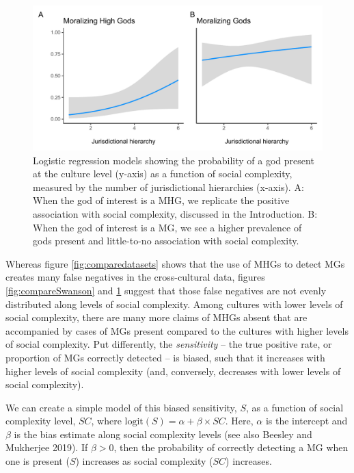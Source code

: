 \documentclass[
]{article}
\begin{document}
\begin{figure}
\centering
\includegraphics{mhg-writeup_files/figure-latex/compareSwansonMods-1.pdf}
\caption{\label{fig:compareSwansonMods}Logistic regression models showing the probability of a god present at the culture level (y-axis) as a function of social complexity, measured by the number of jurisdictional hierarchies (x-axis). A: When the god of interest is a MHG, we replicate the positive association with social complexity, discussed in the Introduction. B: When the god of interest is a MG, we see a higher prevalence of gods present and little-to-no association with social complexity.}
\end{figure}

Whereas figure \ref{fig:comparedatasets} shows that the use of MHGs to detect MGs creates many false negatives in the cross-cultural data, figures \ref{fig:compareSwanson} and \ref{fig:compareSwansonMods} suggest that those false negatives are not evenly distributed along levels of social complexity. Among cultures with lower levels of social complexity, there are many more claims of MHGs absent that are accompanied by cases of MGs present compared to the cultures with higher levels of social complexity. Put differently, the \emph{sensitivity} -- the true positive rate, or proportion of MGs correctly detected -- is biased, such that it increases with higher levels of social complexity (and, conversely, decreases with lower levels of social complexity).

We can create a simple model of this biased sensitivity, \(S\), as a function of social complexity level, \(SC\), where \(\text{logit}(S) = \alpha + \beta \times SC\). Here, \(\alpha\) is the intercept and \(\beta\) is the bias estimate along social complexity levels (see also Beesley and Mukherjee 2019). If \(\beta>0\), then the probability of correctly detecting a MG when one is present (\(S\)) increases as social complexity (\(SC\)) increases.
\end{document}
